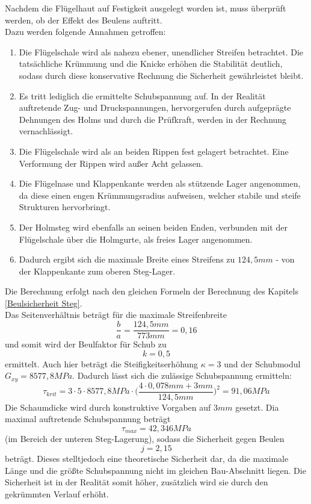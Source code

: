 Nachdem die Flügelhaut auf Festigkeit ausgelegt worden ist, muss überprüft werden, ob der Effekt des Beulens auftritt.\\

\noindent Dazu werden folgende Annahmen getroffen:

\begin{enumerate}
	\item Die Flügelschale wird als nahezu ebener, unendlicher Streifen betrachtet. Die tatsächliche Krümmung und die Knicke erhöhen die Stabilität deutlich, sodass durch diese konservative Rechnung die Sicherheit gewährleistet bleibt.
	\item Es tritt lediglich die ermittelte Schubspannung auf. In der Realität auftretende Zug- und Druckspannungen, hervorgerufen durch aufgeprägte Dehnungen des Holms und durch die Prüfkraft, werden in der Rechnung vernachlässigt.
	\item Die Flügelschale wird als an beiden Rippen fest gelagert betrachtet. Eine Verformung der Rippen wird außer Acht gelassen.
	\item Die Flügelnase und Klappenkante werden als stützende Lager angenommen, da diese einen engen Krümmungsradius aufweisen, welcher stabile und steife Strukturen hervorbringt.
	\item Der Holmsteg wird ebenfalls an seinen beiden Enden, verbunden mit der Flügelschale über die Holmgurte, als freies Lager angenommen.
	\item Dadurch ergibt sich die maximale Breite eines Streifens zu $124,5 mm$ - von der Klappenkante zum oberen Steg-Lager.
\end{enumerate}

\noindent Die Berechnung erfolgt nach den gleichen Formeln der Berechnung des Kapitels \ref{Beulsicherheit Steg}.\\

\noindent Das Seitenverhältnis beträgt für die maximale Streifenbreite
\begin{equation}
	\frac{b}{a}=\frac{124,5 mm}{773 mm}=0,16
\end{equation}
und somit wird der Beulfaktor für Schub zu 
\begin{equation}
	k=0,5
\end{equation} ermittelt. Auch hier beträgt die Steifigkeitserhöhung $\kappa=3$ und der Schubmodul $G_{xy}=8577,8 MPa$. Dadurch lässt sich die zulässige Schubspannung ermitteln:
\begin{equation}
	\tau_{krit}=3\cdot 5\cdot 8577,8 MPa\cdot\biggl(\frac{4\cdot 0,078mm + 3mm}{124,5 mm}\biggr)^{2} =91,06 MPa
\end{equation}
Die Schaumdicke wird durch konstruktive Vorgaben auf $3 mm$ gesetzt. Dia maximal auftretende Schubspannung beträgt
\begin{equation}
	\tau_{max}=42,346 MPa
\end{equation}
(im Bereich der unteren Steg-Lagerung), sodass die Sicherheit gegen Beulen 
\begin{equation}
	j=2,15
\end{equation}
beträgt. Dieses stelltjedoch eine theoretische Sicherheit dar, da die maximale Länge und die größte Schubspannung nicht im gleichen Bau-Abschnitt liegen. Die Sicherheit ist in der Realität somit höher, zusätzlich wird sie durch den gekrümmten Verlauf erhöht.